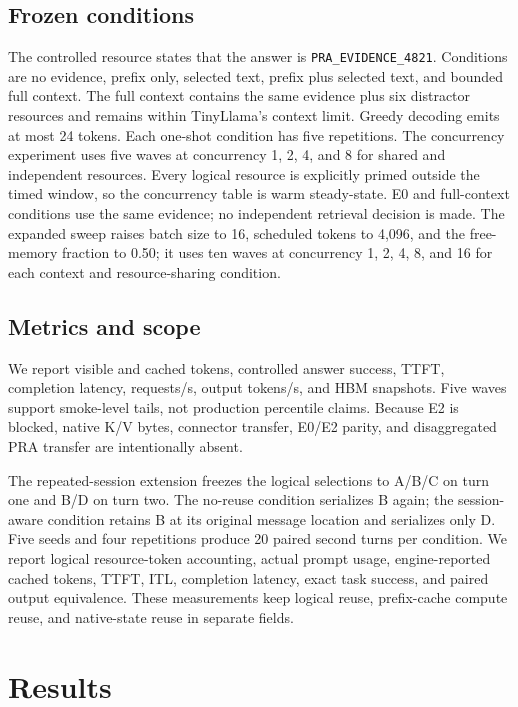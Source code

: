 \documentclass[10pt]{article}
\begin{document}
\subsection{Frozen conditions}
The controlled resource states that the answer is
\texttt{PRA\_EVIDENCE\_4821}. Conditions are no evidence, prefix only,
selected text, prefix plus selected text, and bounded full context. The full
context contains the same evidence plus six distractor resources and remains
within TinyLlama's context limit. Greedy decoding emits at most 24 tokens.
Each one-shot condition has five repetitions. The concurrency experiment
uses five waves at concurrency 1, 2, 4, and 8 for shared and independent
resources. Every logical resource is explicitly primed outside the timed
window, so the concurrency table is warm steady-state. E0 and full-context
conditions use the same evidence; no independent retrieval decision is made.
The expanded sweep raises batch size to 16, scheduled tokens to 4,096, and the
free-memory fraction to 0.50; it uses ten waves at concurrency 1, 2, 4, 8, and
16 for each context and resource-sharing condition.

\subsection{Metrics and scope}
We report visible and cached tokens, controlled answer success, TTFT,
completion latency, requests/s, output tokens/s, and HBM snapshots. Five waves
support smoke-level tails, not production percentile claims. Because E2 is
blocked, native K/V bytes, connector transfer, E0/E2 parity, and disaggregated
PRA transfer are intentionally absent.

The repeated-session extension freezes the logical selections to A/B/C on turn
one and B/D on turn two. The no-reuse condition serializes B again; the
session-aware condition retains B at its original message location and
serializes only D. Five seeds and four repetitions produce 20 paired second
turns per condition. We report logical resource-token accounting, actual prompt
usage, engine-reported cached tokens, TTFT, ITL, completion latency, exact task
success, and paired output equivalence. These measurements keep logical reuse,
prefix-cache compute reuse, and native-state reuse in separate fields.

\section{Results}
\end{document}
